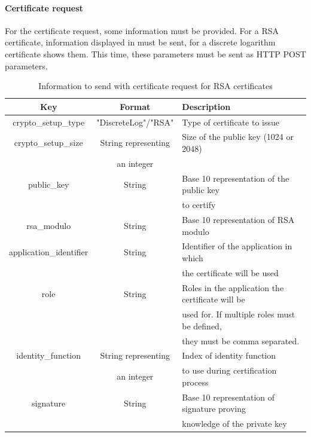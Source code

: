 \documentclass[oneside]{scrreprt}
\begin{document}
\paragraph*{Certificate request}

For the certificate request, some information must be provided. For a RSA certificate, information displayed in  must be sent, for a discrete logarithm certificate  shows them. This time, these parameters must be sent as HTTP POST parameters.

\begin{table}[ht]
\centering
\begin{tabular}{|c|c|l|}
  \hline
  Key & Format & Description\\
  \hline
  crypto\_setup\_type & "DiscreteLog"/"RSA" & Type of certificate to issue\\
  crypto\_setup\_size & String representing & Size of the public key (1024 or 2048)\\ & an integer  & \\
  public\_key & String & Base 10 representation of the public key \\ & & to certify\\
  rsa\_modulo & String & Base 10 representation of RSA modulo\\
  application\_identifier & String & Identifier of the application in which\\ & & the certificate will be used\\
  role & String & Roles in the application the certificate will be\\ & & used for. If multiple roles must be defined,\\ & & they must be comma separated.\\
  identity\_function & String representing & Index of identity function\\ & an integer & to use during certification process\\
  signature & String & Base 10 representation of signature proving\\ & & knowledge of the private key\\
  \hline
\end{tabular}
\caption{Information to send with certificate request for RSA certificates}
\label{t:rsa}
\end{table}
\end{document}
